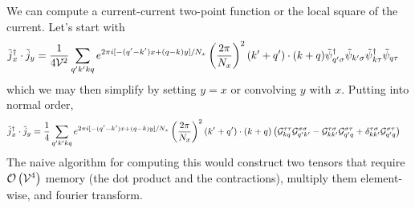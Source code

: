 We can compute a current-current two-point function or the local square of the current.
Let's start with
\begin{align}
	\tilde{j}{}^{\dagger}_x \cdot \tilde{j}_y
	&=
	\frac{1}{4\mathcal{V}^2}\sum_{q'k'kq} e^{2\pi i[ -(q'-k')x + (q-k) y]/N_x} \left(\frac{2\pi}{N_x}\right)^2 (k'+q')\cdot(k+q)
	\tilde{\psi}{}^{\dagger}_{q'\sigma} \tilde{\psi}_{k'\sigma} \tilde{\psi}{}^{\dagger}_{k\tau} \tilde{\psi}_{q\tau}
\end{align}
which we may then simplify by setting $y=x$ or convolving $y$ with $x$.
Putting into normal order,
\begin{align}
	\tilde{j}{}^{\dagger}_x \cdot \tilde{j}_y
	&=
	\frac{1}{4}\sum_{q'k'kq} e^{2\pi i[ -(q'-k')x + (q-k) y]/N_x} \left(\frac{2\pi}{N_x}\right)^2 (k'+q')\cdot(k+q)
	\left(\mathcal{G}^{\tau\tau}_{kq}\mathcal{G}^{\sigma\sigma}_{q'k'} - \mathcal{G}^{\tau\sigma}_{kk'} \mathcal{G}^{\sigma\tau}_{q'q} + \delta^{\tau\sigma}_{kk'} \mathcal{G}^{\sigma\tau}_{q'q}\right)
	\label{eq:jj normal order}
\end{align}
The naive algorithm for computing this would construct two tensors that require $\mathcal{O}\left(\mathcal{V}^4\right)$ memory (the dot product and the contractions), multiply them element-wise, and fourier transform.

